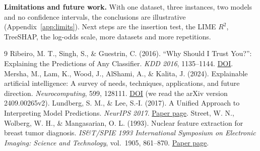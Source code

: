 \documentclass[11pt,a4paper]{article}
\begin{document}
\textbf{Limitations and future work.} With one dataset, three instances, two
models and no confidence intervals, the conclusions are illustrative
(Appendix~\ref{app:limits}). Next steps are the insertion test, the LIME
$R^2$, TreeSHAP, the log-odds scale, more datasets and more repetitions.

\begin{thebibliography}{9}
 Ribeiro, M. T., Singh, S., \& Guestrin, C. (2016). ``Why Should I Trust You?'': Explaining the Predictions of Any Classifier. \emph{KDD 2016}, 1135--1144. \href{https://doi.org/10.1145/2939672.2939778}{DOI}.
 Mersha, M., Lam, K., Wood, J., AlShami, A., \& Kalita, J. (2024). Explainable artificial intelligence: A survey of needs, techniques, applications, and future direction. \emph{Neurocomputing}, 599, 128111. \href{https://doi.org/10.1016/j.neucom.2024.128111}{DOI} (we read the arXiv version 2409.00265v2).
 Lundberg, S. M., \& Lee, S.-I. (2017). A Unified Approach to Interpreting Model Predictions. \emph{NeurIPS 2017}. \href{https://proceedings.neurips.cc/paper_files/paper/2017/hash/8a20a8621978632d76c43dfd28b67767-Abstract.html}{Paper page}.
 Street, W. N., Wolberg, W. H., \& Mangasarian, O. L. (1993). Nuclear feature extraction for breast tumor diagnosis. \emph{IS\&T/SPIE 1993 International Symposium on Electronic Imaging: Science and Technology}, vol.\ 1905, 861--870. \href{https://api.semanticscholar.org/CorpusID:14922543}{Paper page}.
\end{thebibliography}
\end{document}
